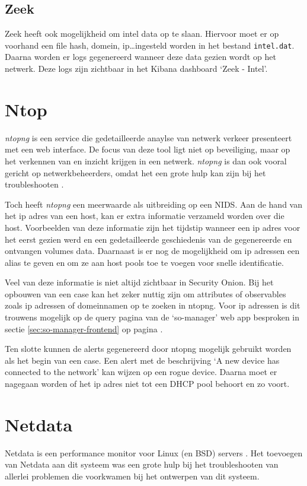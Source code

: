 \documentclass[a4paper,12pt]{report}
\begin{document}
\subsection{Zeek}
Zeek heeft ook mogelijkheid om intel data op te slaan.
Hiervoor moet er op voorhand een file hash, domein, ip\dots ingesteld worden in het bestand \lstinline|intel.dat|.
Daarna worden er logs gegenereerd wanneer deze data gezien wordt op het netwerk.
Deze logs zijn zichtbaar in het Kibana dashboard `Zeek - Intel'.

\section{Ntop}
\emph{ntopng} is een service die gedetailleerde anaylse van netwerk verkeer presenteert met een web interface.
De focus van deze tool ligt niet op beveiliging, maar op het verkennen van en inzicht krijgen in een netwerk.
\emph{ntopng} is dan ook vooral gericht op netwerkbeheerders, omdat het een grote hulp kan zijn bij het troubleshooten \autocite{ntop:ntopng}.

Toch heeft \emph{ntopng} een meerwaarde als uitbreiding op een NIDS.
Aan de hand van het ip adres van een host, kan er extra informatie verzameld worden over die host.
Voorbeelden van deze informatie zijn het tijdstip wanneer een ip adres voor het eerst gezien werd en een gedetailleerde geschiedenis van de gegenereerde en ontvangen volumes data.
Daarnaast is er nog de mogelijkheid om ip adressen een alias te geven en om ze aan host pools toe te voegen voor snelle identificatie.

Veel van deze informatie is niet altijd zichtbaar in Security Onion.
Bij het opbouwen van een case kan het zeker nuttig zijn om attributes of observables zoals ip adressen of domeinnamen op te zoeken in ntopng.
Voor ip adressen is dit trouwens mogelijk op de query pagina van de `so-manager' web app besproken in sectie \ref{sec:so-manager-frontend} op pagina \pageref{sec:so-manager-frontend}.

Ten slotte kunnen de alerts gegenereerd door ntopng mogelijk gebruikt worden als het begin van een case.
Een alert met de beschrijving `A new device has connected to the network' kan wijzen op een rogue device.
Daarna moet er nagegaan worden of het ip adres niet tot een DHCP pool behoort en zo voort.

\section{Netdata}
Netdata is een performance monitor voor Linux (en BSD) servers \autocite{netdata:home}.
Het toevoegen van Netdata aan dit systeem was een grote hulp bij het troubleshooten van allerlei problemen die voorkwamen bij het ontwerpen van dit systeem.
\end{document}

